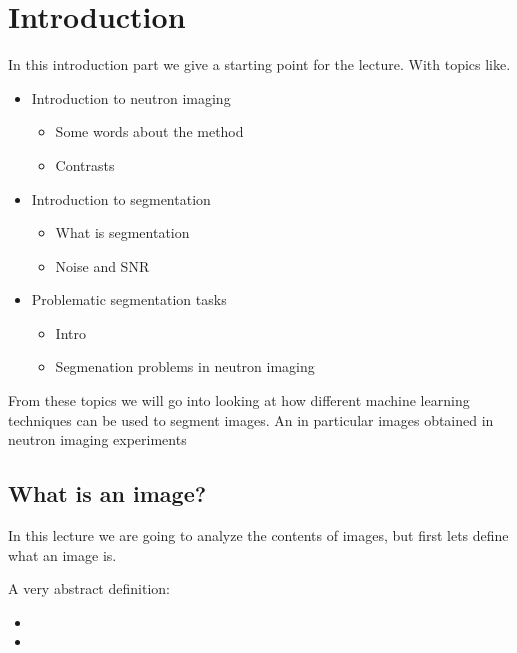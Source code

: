 \documentclass[letterpaper,10pt,english]{sphinxmanual}
\begin{document}
\chapter{Introduction}
\label{\detokenize{ML4NeutronImageSegmentation:introduction}}
In this introduction part we give a starting point for the lecture. With topics like.
\begin{itemize}
\item {} 
Introduction to neutron imaging
\begin{itemize}
\item {} 
Some words about the method

\item {} 
Contrasts

\end{itemize}

\item {} 
Introduction to segmentation
\begin{itemize}
\item {} 
What is segmentation

\item {} 
Noise and SNR

\end{itemize}

\item {} 
Problematic segmentation tasks
\begin{itemize}
\item {} 
Intro

\item {} 
Segmenation problems in neutron imaging

\end{itemize}

\end{itemize}

From these topics we will go into looking at how different machine learning techniques can be used to segment images. An in particular images obtained in neutron imaging experiments


\section{What is an image?}
\label{\detokenize{ML4NeutronImageSegmentation:what-is-an-image}}
In this lecture we are going to analyze the contents of images, but first lets define what an image is.

A very abstract definition:
\begin{itemize}
\item {} 

\item {} 

\end{itemize}
\end{document}
